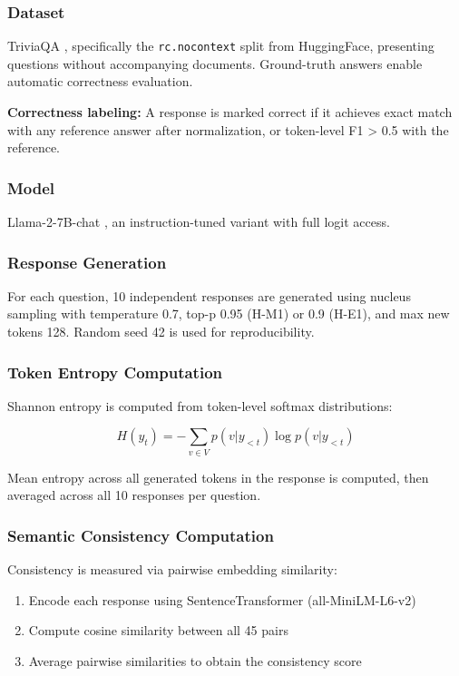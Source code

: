
\subsubsection{Dataset}

TriviaQA \citep{joshi2017triviaqa}, specifically the \texttt{rc.nocontext} split from HuggingFace, presenting questions without accompanying documents. Ground-truth answers enable automatic correctness evaluation.

\textbf{Correctness labeling:} A response is marked correct if it achieves exact match with any reference answer after normalization, or token-level F1 > 0.5 with the reference.

\subsubsection{Model}

Llama-2-7B-chat \citep{touvron2023llama}, an instruction-tuned variant with full logit access.

\subsubsection{Response Generation}

For each question, 10 independent responses are generated using nucleus sampling with temperature 0.7, top-p 0.95 (H-M1) or 0.9 (H-E1), and max new tokens 128. Random seed 42 is used for reproducibility.

\subsubsection{Token Entropy Computation}

Shannon entropy is computed from token-level softmax distributions:

$$H(y_t) = -\sum_{v \in V} p(v | y_{<t}) \log p(v | y_{<t})$$

Mean entropy across all generated tokens in the response is computed, then averaged across all 10 responses per question.

\subsubsection{Semantic Consistency Computation}

Consistency is measured via pairwise embedding similarity:

\begin{enumerate}
\item Encode each response using SentenceTransformer (all-MiniLM-L6-v2)
\item Compute cosine similarity between all 45 pairs
\item Average pairwise similarities to obtain the consistency score
\end{enumerate}

